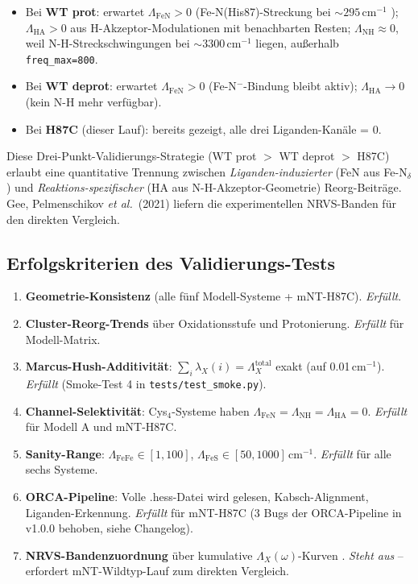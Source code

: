 \documentclass[11pt,a4paper,twoside]{article}
\theoremstyle{remark}
\begin{document}
\begin{itemize}\setlength{\itemsep}{0pt}
  \item Bei \textbf{WT prot}: erwartet $\Lambda_\text{FeN} > 0$
        (Fe-N(His87)-Streckung bei $\sim 295$\,cm$^{-1}$
        \cite{Gee2021}); $\Lambda_\text{HA} > 0$ aus
        H-Akzeptor-Modulationen mit benachbarten Resten;
        $\Lambda_\text{NH} \approx 0$, weil N-H-Streckschwingungen
        bei $\sim 3300$\,cm$^{-1}$ liegen, au{\ss}erhalb
        \texttt{freq\_max=800}.
  \item Bei \textbf{WT deprot}: erwartet $\Lambda_\text{FeN} > 0$
        (Fe-N$^-$-Bindung bleibt aktiv); $\Lambda_\text{HA} \to 0$
        (kein N-H mehr verf\"ugbar).
  \item Bei \textbf{H87C} (dieser Lauf): bereits gezeigt, alle drei
        Liganden-Kan\"ale = 0.
\end{itemize}

Diese Drei-Punkt-Validierungs-Strategie (WT prot $>$ WT deprot
$>$ H87C) erlaubt eine quantitative Trennung zwischen
\emph{Liganden-induzierter} (FeN aus Fe-N$_\delta$) und
\emph{Reaktions-spezifischer} (HA aus N-H-Akzeptor-Geometrie)
Reorg-Beitr\"age. Gee, Pelmenschikov \emph{et al.}\ (2021)
\cite{Gee2021} liefern die experimentellen NRVS-Banden f\"ur den
direkten Vergleich.

\subsection{Erfolgskriterien des Validierungs-Tests}
\label{sec:val-erfolgskriterien}

\begin{enumerate}
  \item \textbf{Geometrie-Konsistenz} (alle f\"unf Modell-Systeme +
        mNT-H87C). \emph{Erf\"ullt}.
  \item \textbf{Cluster-Reorg-Trends} \"uber Oxidationsstufe und
        Protonierung. \emph{Erf\"ullt} f\"ur Modell-Matrix.
  \item \textbf{Marcus-Hush-Additivit\"at}: $\sum_i \lambda_X(i) =
        \Lambda_X^\text{total}$ exakt (auf 0.01\,cm$^{-1}$).
        \emph{Erf\"ullt} (Smoke-Test 4 in \texttt{tests/test\_smoke.py}).
  \item \textbf{Channel-Selektivit\"at}: Cys$_4$-Systeme haben
        $\Lambda_\text{FeN} = \Lambda_\text{NH} = \Lambda_\text{HA} = 0$.
        \emph{Erf\"ullt} f\"ur Modell A und mNT-H87C.
  \item \textbf{Sanity-Range}: $\Lambda_\text{FeFe} \in [1, 100]$,
        $\Lambda_\text{FeS} \in [50, 1000]$\,cm$^{-1}$. \emph{Erf\"ullt}
        f\"ur alle sechs Systeme.
  \item \textbf{ORCA-Pipeline}: Volle .hess-Datei wird gelesen,
        Kabsch-Alignment, Liganden-Erkennung. \emph{Erf\"ullt} f\"ur
        mNT-H87C (3 Bugs der ORCA-Pipeline in v1.0.0 behoben, siehe Changelog).
  \item \textbf{NRVS-Bandenzuordnung} \"uber kumulative
        $\Lambda_X(\omega)$-Kurven \cite{Gee2021,Wang2025}.
        \emph{Steht aus} -- erfordert mNT-Wildtyp-Lauf zum
        direkten Vergleich.
\end{enumerate}
\end{document}
